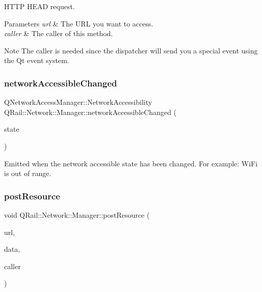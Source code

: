 H\+T\+TP H\+E\+AD request. 


\begin{DoxyParams}{Parameters}
{\em url} & The U\+RL you want to access. \\
\hline
{\em caller} & The caller of this method. \\
\hline
\end{DoxyParams}
\begin{DoxyNote}{Note}
The caller is needed since the dispatcher will send you a special event using the Qt event system. 
\end{DoxyNote}
\mbox{\label{classQRail_1_1Network_1_1Manager_af81d89d8572d74d039400ec2e05f9894}} 
\subsubsection{\texorpdfstring{networkAccessibleChanged}{networkAccessibleChanged}}
{\footnotesize\ttfamily Q\+Network\+Access\+Manager\+::\+Network\+Accessibility Q\+Rail\+::\+Network\+::\+Manager\+::network\+Accessible\+Changed (\begin{DoxyParamCaption}\item[{Q\+Network\+Access\+Manager\+::\+Network\+Accessibility}]{state }\end{DoxyParamCaption})\hspace{0.3cm}{\ttfamily [signal]}}



Emitted when the network accessible state has been changed. For example\+: Wi\+Fi is out of range. 

\mbox{\label{classQRail_1_1Network_1_1Manager_a7f479ad3bcff90ffba6fab969294c338}} 
\subsubsection{\texorpdfstring{postResource}{postResource}}
{\footnotesize\ttfamily void Q\+Rail\+::\+Network\+::\+Manager\+::post\+Resource (\begin{DoxyParamCaption}\item[{const Q\+Url \&}]{url,  }\item[{const Q\+Byte\+Array \&}]{data,  }\item[{Q\+Object $\ast$}]{caller }\end{DoxyParamCaption})\hspace{0.3cm}{\ttfamily [slot]}}




